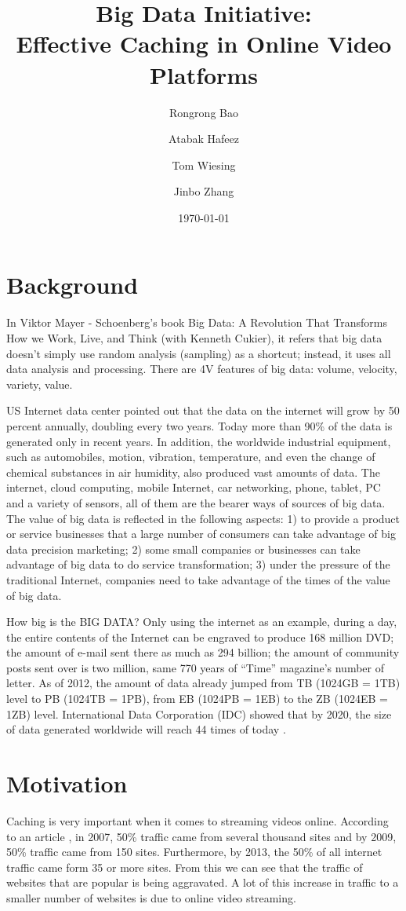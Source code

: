 \documentclass[a4paper,10pt]{article}
\title{Big Data Initiative:\\Effective Caching in Online Video Platforms}
\author{Rongrong Bao \and Atabak Hafeez \and Tom Wiesing \and Jinbo Zhang}
\date{\today}
\begin{document}
\maketitle

\section{Background}

In Viktor Mayer - Schoenberg’s book Big Data: A Revolution That Transforms How we Work, Live, and Think (with Kenneth Cukier), it refers that big data doesn't simply use random analysis (sampling) as a shortcut; instead, it uses all data analysis and processing. There are 4V features of big data: volume, velocity, variety, value.

US Internet data center pointed out that the data on the internet will grow by 50 percent annually, doubling every two years. Today more than 90\% of the data is generated only in recent years. In addition, the worldwide industrial equipment, such as automobiles, motion, vibration, temperature, and even the change of chemical substances in air humidity, also produced vast amounts of data. The internet, cloud computing, mobile Internet, car networking, phone, tablet, PC and a variety of sensors, all of them are the bearer ways of sources of big data. The value of big data is reflected in the following aspects: 1) to provide a product or service businesses that a large number of consumers can take advantage of big data precision marketing; 2) some small companies or businesses can take advantage of big data to do service transformation; 3) under the pressure of the traditional Internet, companies need to take advantage of the times of the value of big data.

How big is the BIG DATA? Only using the internet as an example, during a day, the entire contents of the Internet can be engraved to produce 168 million DVD; the amount of e-mail sent there as much as 294 billion; the amount of community posts sent over is two million, same 770 years of ``Time'' magazine’s number of letter. As of 2012, the amount of data already jumped from TB (1024GB = 1TB) level to PB (1024TB = 1PB), from EB (1024PB = 1EB) to the ZB (1024EB = 1ZB) level. International Data Corporation (IDC) showed that by 2020, the size of data generated worldwide will reach 44 times of today .

\section{Motivation}
Caching is very important when it comes to streaming videos online. According to an article \cite{OnlineVideoBandwagon}, in 2007, 50\% traffic came from several thousand sites and by 2009, 50\% traffic came from 150 sites. Furthermore, by 2013, the 50\% of all internet traffic came form 35 or more sites. From this we can see that the traffic of websites that are popular is being aggravated. A lot of this increase in traffic to a smaller number of websites is due to online video streaming.
\end{document}
